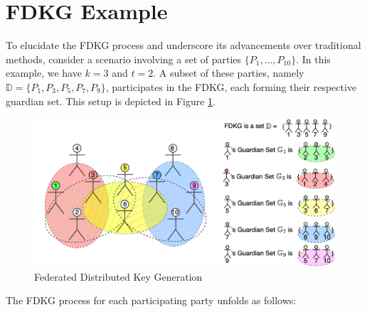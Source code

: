 \documentclass[runningheads]{llncs}
\begin{document}
\section{FDKG Example}

To elucidate the FDKG process and underscore its advancements over traditional methods, consider a scenario involving a set of parties $\{P_1, \ldots, P_{10}\}$. In this example, we have $k = 3$ and $t = 2$. A subset of these parties, namely $\mathbb{D} = \{P_1, P_3, P_5, P_7, P_9\}$, participates in the FDKG, each forming their respective guardian set. This setup is depicted in Figure \ref{fig:FDKG}.

\begin{figure}
    \centering
    \includegraphics[width=.7\textwidth]{FDKG.png}
    \caption{Federated Distributed Key Generation}
    \label{fig:FDKG}
\end{figure}

The FDKG process for each participating party unfolds as follows:
\end{document}
